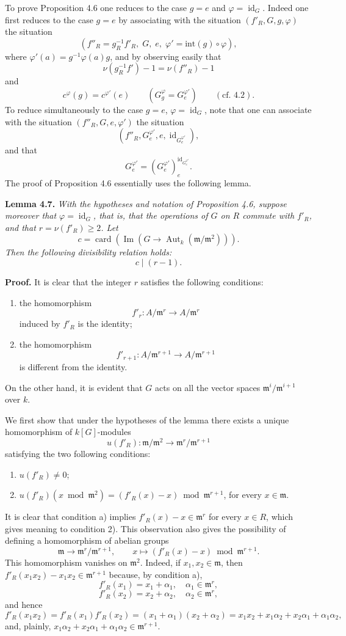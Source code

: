 \documentclass[11pt]{article}
\providecommand{\fm}{\mathfrak{m}}
\providecommand{\id}{\operatorname{id}}
\providecommand{\id}{\operatorname{id}}
\providecommand{\id}{\operatorname{id}}
\providecommand{\Aut}{\operatorname{Aut}}
\providecommand{\id}{\operatorname{id}}
\providecommand{\id}{\operatorname{id}}
\providecommand{\im}{\operatorname{Im}}
\providecommand{\fm}{\mathfrak m}
\providecommand{\card}{\operatorname{card}}
\providecommand{\im}{\operatorname{im}}
\providecommand{\Aut}{\operatorname{Aut}}
\providecommand{\id}{\operatorname{id}}
\begin{document}
\medskip
To prove Proposition 4.6 one reduces to the case $g=e$ and $\varphi=\id_G$. Indeed one first reduces to the case $g=e$ by associating with the situation $(f'_R,G,g,\varphi)$ the situation
\[
(f''_R=g_R^{-1}f'_R,
\; G,
\; e,
\; \varphi'=\mathrm{int}(g)\circ\varphi),
\]
where $\varphi'(a)=g^{-1}\varphi(a)g$, and by observing easily that
\[
\nu(g_R^{-1}f')-1=\nu(f''_R)-1
\]
and
\[
c^\varphi(g)=c^{\varphi'}(e)\qquad (G_g^\varphi=G_e^{\varphi'})\qquad (\text{cf. 4.2}).
\]
To reduce simultaneously to the case $g=e$, $\varphi=\id_G$, note that one can associate with the situation $(f''_R,G,e,\varphi')$ the situation
\[
(f''_R,G_e^{\varphi'},e,\id_{G_e^{\varphi'}}),
\]
and that
\[
G_e^{\varphi'}=(G_e^{\varphi'})_e^{\id_{G_e^{\varphi'}}}.
\]
The proof of Proposition 4.6 essentially uses the following lemma.

\medskip
\noindent
\textbf{Lemma 4.7.} \emph{With the hypotheses and notation of Proposition 4.6, suppose moreover that $\varphi=\id_G$, that is, that the operations of $G$ on $R$ commute with $f'_R$, and that $r=\nu(f'_R)\ge2$. Let
\[
c=\card(\im(G\longrightarrow \Aut_k(\fm/\fm^2))).
\]
Then the following divisibility relation holds:
\[
c\mid (r-1).
\]}

\medskip
\noindent
\textbf{Proof.} It is clear that the integer $r$ satisfies the following conditions:
\begin{enumerate}
\item[a)] the homomorphism
\[
f'_r:A/\fm^r\longrightarrow A/\fm^r
\]
induced by $f'_R$ is the identity;
\item[b)] the homomorphism
\[
f'_{r+1}:A/\fm^{r+1}\longrightarrow A/\fm^{r+1}
\]
is different from the identity.
\end{enumerate}
On the other hand, it is evident that $G$ acts on all the vector spaces $\fm^i/\fm^{i+1}$ over $k$.

We first show that under the hypotheses of the lemma there exists a unique homomorphism of $k[G]$-modules
\[
u(f'_R):\fm/\fm^2\longrightarrow \fm^r/\fm^{r+1}
\]
satisfying the two following conditions:
\begin{enumerate}
\item[1)] $u(f'_R)\ne0$;
\item[2)] $u(f'_R)(x\bmod \fm^2)=(f'_R(x)-x)\bmod \fm^{r+1}$, for every $x\in\fm$.
\end{enumerate}
It is clear that condition a) implies $f'_R(x)-x\in\fm^r$ for every $x\in R$, which gives meaning to condition 2). This observation also gives the possibility of defining a homomorphism of abelian groups
\[
\fm\longrightarrow \fm^r/\fm^{r+1},
\qquad
x\longmapsto (f'_R(x)-x)\bmod \fm^{r+1}.
\]
This homomorphism vanishes on $\fm^2$. Indeed, if $x_1,x_2\in\fm$, then $f'_R(x_1x_2)-x_1x_2\in\fm^{r+1}$ because, by condition a),
\[
f'_R(x_1)=x_1+\alpha_1,
\quad \alpha_1\in\fm^r,
\]
\[
f'_R(x_2)=x_2+\alpha_2,
\quad \alpha_2\in\fm^r,
\]
and hence
\[
f'_R(x_1x_2)=f'_R(x_1)f'_R(x_2)=(x_1+\alpha_1)(x_2+\alpha_2)
=x_1x_2+x_1\alpha_2+x_2\alpha_1+\alpha_1\alpha_2,
\]
and, plainly, $x_1\alpha_2+x_2\alpha_1+\alpha_1\alpha_2\in\fm^{r+1}$.
\end{document}

